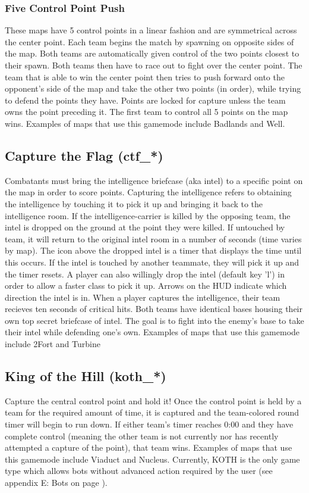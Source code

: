 \subsubsection{Five Control Point Push}
These maps have 5 control points in a linear fashion and are symmetrical across the center point. Each team begins the match by spawning on opposite sides of the map. Both teams are automatically given control of the two points closest to their spawn. Both teams then have to race out to fight over the center point. The team that is able to win the center point then tries to push forward onto the opponent's side of the map and take the other two points (in order), while trying to defend the points they have. Points are locked for capture unless the team owns the point preceding it. The first team to control all 5 points on the map wins. Examples of maps that use this gamemode include Badlands and Well.

\subsection{Capture the Flag (ctf\_*)}
Combatants must bring the intelligence briefcase (aka intel) to a specific point on the map in order to score points. Capturing the intelligence refers to obtaining the intelligence by touching it to pick it up and bringing it back to the intelligence room.  If the intelligence-carrier is killed by the opposing team, the intel is dropped on the ground at the point they were killed. If untouched by team, it will return to the original intel room in a number of seconds (time varies by map).  The icon above the dropped intel is a timer that displays the time until this occurs.  If the intel is touched by another teammate, they will pick it up and the timer resets. A player can also willingly drop the intel (default key 'l') in order to allow a faster class to pick it up. Arrows on the HUD indicate which direction the intel is in. When a player captures the intelligence, their team recieves ten seconds of critical hits. Both teams have identical bases housing their own top secret briefcase of intel.  The goal is to fight into the enemy's base to take their intel while defending one's own. Examples of maps that use this gamemode include 2Fort and Turbine

\subsection{King of the Hill (koth\_*)}
Capture the central control point and hold it!  Once the control point is held by a team for the required amount of time, it is captured and the team-colored round timer will begin to run down. If either team's timer reaches 0:00 and they have complete control (meaning the other team is not currently nor has recently attempted a capture of the point), that team wins. Examples of maps that use this gamemode include Viaduct and Nucleus. Currently, KOTH is the only game type which allows bots without advanced action required by the user (see appendix E: Bots on page \pageref{Bots}).

